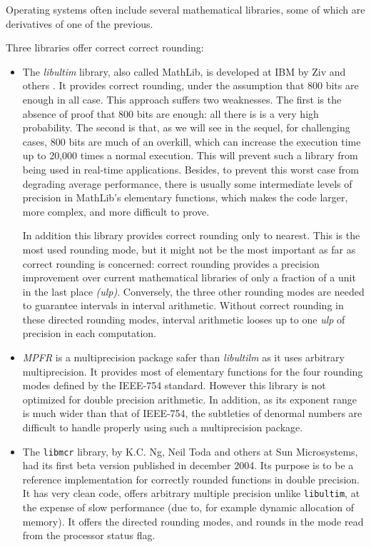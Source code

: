 Operating systems often include several mathematical libraries, some of which are derivatives of one
of the previous.

Three libraries offer correct correct rounding:
\begin{itemize}
\item The \emph{libultim} library, also called MathLib, is developed at
  IBM by Ziv and others \cite{IBMlibultimweb}. It provides correct rounding,
  under the assumption that 800 bits are enough in all case. This
  approach suffers two weaknesses. The first is the absence of proof
  that 800 bits are enough: all there is is a very high probability.
  The second is that, as we will see in the sequel, for challenging
  cases, 800 bits are much of an overkill, which can increase the
  execution time up to 20,000 times a normal execution. This will
  prevent such a library from being used in real-time applications.
  Besides, to prevent this worst case from degrading average
  performance, there is usually some intermediate levels of precision
  in MathLib's elementary functions, which makes the code larger, more
  complex, and more difficult to prove.
  
  In addition this library provides correct rounding only to nearest.
  This is the most used rounding mode, but it might not be the most
  important as far as correct rounding is concerned: correct rounding
  provides a precision improvement over current mathematical libraries
  of only a fraction of a {unit in the last place} \emph{(ulp)}.
  Conversely, the three other rounding modes are needed to guarantee
  intervals in interval arithmetic.  Without correct rounding in these
  directed rounding modes, interval arithmetic looses up to one
  \emph{ulp} of precision in each computation.
  
\item \emph{MPFR} is a multiprecision package safer than
  \emph{libultilm} as it uses arbitrary multiprecision. It provides
  most of elementary functions for the four rounding modes defined by
  the IEEE-754 standard. However this library is not optimized for
  double precision arithmetic. In addition, as its exponent range is
  much wider than that of IEEE-754, the subtleties of denormal numbers
  are difficult to handle properly using such a multiprecision
  package.

\item The \texttt{libmcr} library, by K.C. Ng, Neil Toda and others at
  Sun Microsystems, had its first beta version published in december
  2004. Its purpose is to be a reference implementation for correctly
  rounded functions in double precision. It has very clean code,
  offers arbitrary multiple precision unlike \texttt{libultim}, at the
  expense of slow performance (due to, for example dynamic allocation
  of memory). It offers the directed rounding modes, and rounds in the
  mode read from the processor status flag.
\end{itemize}


